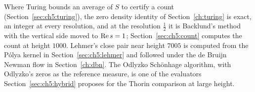 Where Turing bounds an average of $S$ to certify a count (Section~\ref{sec:ch5:turing}), the zero density identity of Section~\ref{ch:turing} is exact, an integer at every resolution, and at the resolution $\frac12$ it is Backlund's method with the vertical side moved to $\operatorname{Re} s=1$; Section~\ref{sec:ch5:count} computes the count at height $1000$. Lehmer's close pair near height $7005$ \cite{Lehmer56} is computed from the P\'olya kernel in Section~\ref{sec:ch5:lehmer} and followed under the de Bruijn Newman flow in Section~\ref{ch:dbn}. The Odlyzko Sch\"onhage algorithm, with Odlyzko's zeros as the reference measure, is one of the evaluators Section~\ref{sec:ch5:hybrid} proposes for the Thorin comparison at large height.

